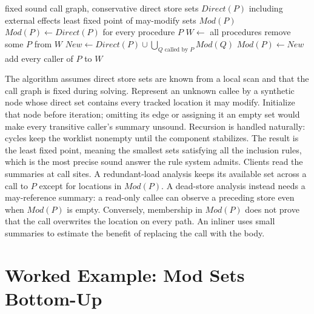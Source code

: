 \begin{algorithm}
  \caption{May-modify summaries over the call graph}\label{alg:ch22-maymod}
  \begin{pseudocode}
    \Require fixed sound call graph, conservative direct store sets $Direct(P)$ including external effects
    \Ensure least fixed point of may-modify sets $Mod(P)$
    \State $Mod(P) \gets Direct(P)$ for every procedure $P$
    \State $W \gets$ all procedures
      \State remove some $P$ from $W$
      \State $New \gets Direct(P) \cup \bigcup_{Q \text{ called by } P} Mod(Q)$
        \State $Mod(P) \gets New$
        \State add every caller of $P$ to $W$
      \EndIf
    \EndWhile
  \end{pseudocode}
\end{algorithm}

The algorithm assumes direct store sets are known from a local scan and that the call graph is fixed during solving.
Represent an unknown callee by a synthetic node whose direct set contains every tracked location it may modify.
Initialize that node before iteration; omitting its edge or assigning it an empty set would make every transitive caller's summary unsound.
Recursion is handled naturally: cycles keep the worklist nonempty until the component stabilizes.
The result is the least fixed point, meaning the smallest sets satisfying all the inclusion rules, which is the most precise sound answer the rule system admits.
Clients read the summaries at call sites.
A redundant-load analysis keeps its available set across a call to $P$ except for locations in $Mod(P)$.
A dead-store analysis instead needs a may-reference summary: a read-only callee can observe a preceding store even when $Mod(P)$ is empty.
Conversely, membership in $Mod(P)$ does not prove that the call overwrites the location on every path.
An inliner uses small summaries to estimate the benefit of replacing the call with the body.

\section{Worked Example: Mod Sets Bottom-Up}
\label{sec:ch22-worked-mod}

